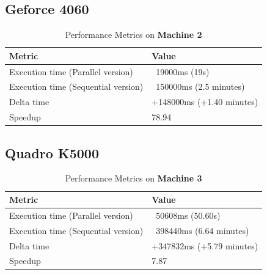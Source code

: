         
        \subsection{Geforce 4060}
        
        \begin{table}[H]
            \centering
            \begin{tabular}{|l|l|}
            \hline
            \textbf{Metric}                         & \textbf{Value}                       \\ \hline
            Execution time (Parallel version)       & ~19000ms (19s)                        \\ \hline
            Execution time (Sequential version)     & ~150000ms (2.5 minutes)               \\ \hline
            Delta time                               & +148000ms (+1.40 minutes)            \\ \hline
            Speedup                                  & 78.94                                  \\ \hline
            \end{tabular}
            \caption{Performance Metrics on \textbf{Machine 2}}
            \label{table:performance_metrics_test2_machine2}
        \end{table}
        
        
        \subsection{Quadro K5000}
        
        \begin{table}[H]
            \centering
            \begin{tabular}{|l|l|}
            \hline
            \textbf{Metric}                         & \textbf{Value}                       \\ \hline
            Execution time (Parallel version)       & ~50608ms (50.60s)                     \\ \hline
            Execution time (Sequential version)     & ~398440ms (6.64 minutes)              \\ \hline
            Delta time                               & +347832ms (+5.79 minutes)            \\ \hline
            Speedup                                  & 7.87                                   \\ \hline
            \end{tabular}
            \caption{Performance Metrics on \textbf{Machine 3}}
            \label{table:performance_metrics_test2_machine3}
        \end{table}

